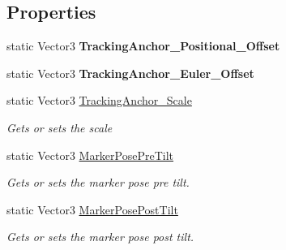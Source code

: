 \subsection*{Properties}
\begin{DoxyCompactItemize}
\item 
\mbox{\label{class_ximmerse_1_1_slide_in_s_d_k_1_1_tracking_config_abca4cf4f03abbfd7bca12f98054fc04b}} 
static Vector3 {\bfseries Tracking\+Anchor\+\_\+\+Positional\+\_\+\+Offset}
\item 
\mbox{\label{class_ximmerse_1_1_slide_in_s_d_k_1_1_tracking_config_a1816d5010a7f4d31ea3bb456355c5268}} 
static Vector3 {\bfseries Tracking\+Anchor\+\_\+\+Euler\+\_\+\+Offset}
\item 
static Vector3 \mbox{\hyperlink{class_ximmerse_1_1_slide_in_s_d_k_1_1_tracking_config_ac517ae77f96e8132c1e75c9233571f16}{Tracking\+Anchor\+\_\+\+Scale}}
\begin{DoxyCompactList}\small\item\em Gets or sets the scale \end{DoxyCompactList}\item 
static Vector3 \mbox{\hyperlink{class_ximmerse_1_1_slide_in_s_d_k_1_1_tracking_config_ad7f2b1406e61c6ed59e1cdb6c44c5b45}{Marker\+Pose\+Pre\+Tilt}}
\begin{DoxyCompactList}\small\item\em Gets or sets the marker pose pre tilt. \end{DoxyCompactList}\item 
static Vector3 \mbox{\hyperlink{class_ximmerse_1_1_slide_in_s_d_k_1_1_tracking_config_a2e492546d56baf6255e04458ab883000}{Marker\+Pose\+Post\+Tilt}}
\begin{DoxyCompactList}\small\item\em Gets or sets the marker pose post tilt. \end{DoxyCompactList}\item 

\end{DoxyCompactItemize}
